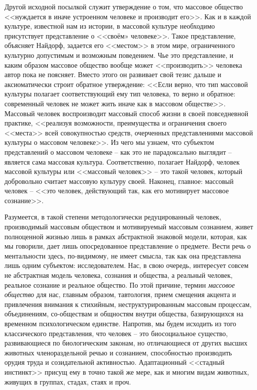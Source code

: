 Другой исходной посылкой служит утверждение о том, что массовое общество <<нуждается в иначе устроенном
человеке и производит его>>. Как и в каждой культуре, известной нам из истории, в
массовой культуре необходимо присутствует представление о <<своём» человеке>>.\autocite{ocherki} Такое представление,
объясняет Найдорф, задается его <<местом>> в этом мире, ограниченного культурно допустимым и возможным поведением.\autocite{naydof}
Чье это представление, и каким образом массовое общество вообще может <<производить>>
человека автор пока не поясняет. Вместо этого он развивает свой тезис дальше и аксиоматически
строит обратное утверждение: <<Если верно, что тип массовой культуры полагает соответствующий ему тип человека,
то верно и обратное: современный человек не может жить иначе как в массовом обществе>>.\autocite{ocherki}
Массовый человек воспроизводит массовый способ жизни в своей повседневной практике, <<реализуя возможности,
преимущества и ограничения своего <<места>> всей совокупностью средств, очерченных представлениями массовой
культуры о массовом человеке>>.\autocite{ocherki} Из чего мы узнаем, что субъектом представлений о массовом человеке --
как это не парадоксально выглядит -- является сама массовая культура. Соответственно, полагает Найдорф,
человек массовой культуры или <<массовый человек>> -- это такой человек, который добровольно считает
массовую культуру своей. Наконец, главное: массовый человек -- <<это человек, действующий так, как его
мотивирует массовое сознание>>.\autocite{ocherki}

Разумеется, в такой степени методологически редуцированный человек, производимый массовым обществом и
мотивируемый массовым сознанием, живет полноценной жизнью лишь в рамках абстрактной знаковой модели,
которая, как мы говорили, дает лишь опосредованное представление о предмете. Вести речь о ментальности
здесь, по-видимому, не имеет смысла, так как она представлена лишь одним субъектом: исследователем.
Нас, в свою очередь, интересует совсем не абстрактная модель человека, сознания и общества, а реальный человек,
реальное сознание и реальное общество. По этой причине, термин \emph{массовое общество} для нас, главным образом,
тавтология, прием смещения акцента и привлечения внимания к стихийным, неструктурированным массовым процессам,
объединениям, со-обществам и общностям внутри общества, базирующихся на временном психологическом единстве.
Напротив, мы будем исходить из того классического представления, что человек -- это биосоциальное существо,
развивающиеся по биологическим законам, но отличающиеся от других высших животных членораздельной речью и
сознанием, способностью производить орудия труда и созидательной активностью. Адаптационный <<стадный инстинкт>>
присущ ему в точно такой же мере, как и многим видам животных, живущих в группах, стадах, стаях и проч.

